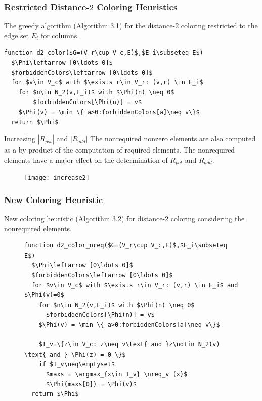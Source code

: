 \documentclass{beamer}
\DeclareMathOperator*{\argmax}{arg\,max}
\newcommand{\nreq}{L}
\begin{document}
\begin{frame}[fragile]
\frametitle{Restricted Distance-$2$ Coloring Heuristics}
{\color{green} The greedy algorithm (Algorithm 3.1)} for
the distance-$2$ coloring restricted to the edge set $E_i$
for columns.
\begin{lstlisting}[mathescape]
function d2_color($G=(V_r\cup V_c,E)$,$E_i\subseteq E$)
  $\Phi\leftarrow [0\ldots 0]$
  $forbiddenColors\leftarrow [0\ldots 0]$
  for $v\in V_c$ with $\exists r\in V_r: (v,r) \in E_i$
    for $n\in N_2(v,E_i)$ with $\Phi(n) \neq 0$
        $forbiddenColors[\Phi(n)] = v$
    $\Phi(v) = \min \{ a>0:forbiddenColors[a]\neq v\}$
  return $\Phi$
\end{lstlisting}
\end{frame}

\begin{frame}{Increasing $|R_{pot}|$ and $| R_{add}|$}
The nonrequired nonzero elements are also computed as a by-product of the computation of required elements.
The nonrequired elements have a major effect on the determination of $R_{pot}$ and $R_{add}$.

\begin{figure}
\centering
\texttt{[image: increase2]}
\end{figure}
\end{frame}

\begin{frame}[fragile]
\frametitle{New Coloring Heuristic}
{\color{blue} New coloring heuristic (Algorithm 3.2)} for distance-$2$ coloring
considering the nonrequired elements.
\begin{figure}
\begin{lstlisting}[mathescape]
function d2_color_nreq($G=(V_r\cup V_c,E)$,$E_i\subseteq E$)
  $\Phi\leftarrow [0\ldots 0]$
  $forbiddenColors\leftarrow [0\ldots 0]$
  for $v\in V_c$ with $\exists r\in V_r: (v,r) \in E_i$ and $\Phi(v)=0$
    for $n\in N_2(v,E_i)$ with $\Phi(n) \neq 0$
      $forbiddenColors[\Phi(n)] = v$
    $\Phi(v) = \min \{ a>0:forbiddenColors[a]\neq v\}$

    $I_v=\{z\in V_c: z\neq v\text{ and }z\notin N_2(v) \text{ and } \Phi(z) = 0 \}$
    if $I_v\neq\emptyset$
      $maxs = \argmax_{x\in I_v} \nreq_v (x)$
      $\Phi(maxs[0]) = \Phi(v)$
  return $\Phi$
\end{lstlisting}
\end{figure}
\end{frame}
\end{document}
